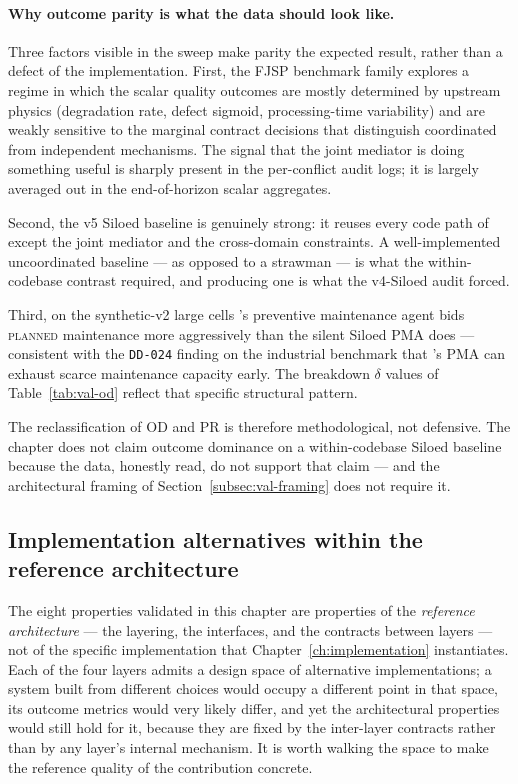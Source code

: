 \paragraph{Why outcome parity is what the data should look like.}
Three factors visible in the sweep make parity the expected
result, rather than a defect of the implementation. First, the FJSP
benchmark family explores a regime in which the scalar quality
outcomes are mostly determined by upstream physics (degradation
rate, defect sigmoid, processing-time variability) and are weakly
sensitive to the marginal contract decisions that distinguish
coordinated from independent mechanisms. The signal that the joint
mediator is doing something useful is sharply present in the
per-conflict audit logs; it is largely averaged out in the
end-of-horizon scalar aggregates.

Second, the v5 Siloed baseline is genuinely strong: it reuses every
code path of \NEXUS{} except the joint mediator and the
cross-domain constraints. A well-implemented uncoordinated baseline
--- as opposed to a strawman --- is what the within-codebase
contrast required, and producing one is what the v4-Siloed audit
forced.

Third, on the synthetic-v2 large cells \NEXUS{}'s preventive
maintenance agent bids \textsc{planned} maintenance more
aggressively than the silent Siloed PMA does --- consistent with
the \texttt{DD-024} finding on the industrial benchmark that
\NEXUS{}'s PMA can exhaust scarce maintenance capacity early. The
breakdown $\delta$ values of Table~\ref{tab:val-od} reflect that
specific structural pattern.

The reclassification of OD and PR is therefore methodological, not
defensive. The chapter does not claim outcome dominance on a
within-codebase Siloed baseline because the data, honestly read, do
not support that claim --- and the architectural framing of
Section~\ref{subsec:val-framing} does not require it.

\subsection{Implementation alternatives within the reference architecture}
\label{subsec:val-altimpl}

The eight properties validated in this chapter are properties of the
\emph{reference architecture} --- the layering, the interfaces, and
the contracts between layers --- not of the specific implementation
that Chapter~\ref{ch:implementation} instantiates. Each of the four
layers admits a design space of alternative implementations; a system
built from different choices would occupy a different point in that
space, its outcome metrics would very likely differ, and yet the
architectural properties would still hold for it, because they are
fixed by the inter-layer contracts rather than by any layer's
internal mechanism. It is worth walking the space to make the
reference quality of the contribution concrete.

